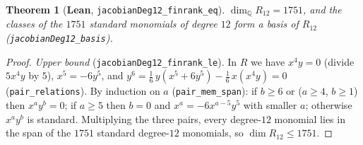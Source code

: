 \documentclass[11pt]{amsart}
\newtheorem{theorem}{Theorem}[section]
\theoremstyle{remark}\newtheorem{remark}[theorem]{Remark}
\newcommand{\Q}{\mathbb{Q}}\newcommand{\PP}{\mathbb{P}}
\begin{document}
\begin{theorem}[\textbf{Lean}, \texttt{jacobianDeg12\_finrank\_eq}]\label{thm:r12}
$\dim_{\Q}R_{12}=1751$, and the classes of the $1751$ standard monomials of degree $12$
form a basis of $R_{12}$ (\texttt{jacobianDeg12\_basis}).
\end{theorem}
\begin{proof}
\emph{Upper bound} (\texttt{jacobianDeg12\_finrank\_le}). In $R$ we have $x^4y=0$
(divide $5x^4y$ by $5$), $x^5=-6y^5$, and
$y^6=\tfrac16\,y(x^5+6y^5)-\tfrac16\,x(x^4y)=0$ (\texttt{pair\_relations}). By
induction on $a$ (\texttt{pair\_mem\_span}): if $b\ge6$ or ($a\ge4$, $b\ge1$) then
$x^ay^b=0$; if $a\ge5$ then $b=0$ and $x^a=-6x^{a-5}y^5$ with smaller $a$; otherwise
$x^ay^b$ is standard. Multiplying the three pairs, every degree-$12$ monomial lies in the
span of the $1751$ standard degree-$12$ monomials, so $\dim R_{12}\le1751$.


\end{proof}
\end{document}
